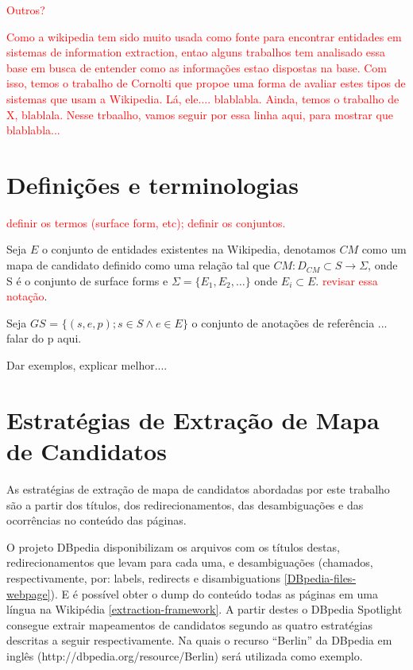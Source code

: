 \documentclass[10pt,a4paper]{llncs}
\begin{document}
\textcolor{red}{Outros?}


\textcolor{red}{Como a wikipedia tem sido muito usada como fonte para encontrar entidades em sistemas de information extraction, entao alguns trabalhos tem analisado essa base em busca de entender como as informações estao dispostas na base. Com isso, temos o trabalho de Cornolti que propoe uma forma de avaliar estes tipos de sistemas que usam a Wikipedia. Lá, ele.... blablabla. Ainda, temos o trabalho de X, blablala. Nesse trbaalho, vamos seguir por essa linha aqui, para mostrar que blablabla...}

\section{Definições e terminologias}
\textcolor{red}{definir os termos (surface form, etc); definir os conjuntos.}

Seja $E$ o conjunto de entidades existentes na Wikipedia, denotamos $CM$ como um mapa de candidato definido como uma relação tal que $CM : D_{CM} \subset S \rightarrow \Sigma $, onde S é o conjunto de surface forms e $ \Sigma = \{ E_1, E_2, \ldots \}$ onde $E_i \subset E$. \textcolor{red}{revisar essa notação}.

Seja $GS$ = $\{(s, e, p); s \in S \wedge e \in E\}$ o conjunto de anotações de referência ... falar do p aqui.

Dar exemplos, explicar melhor....



\section{Estratégias de Extração de Mapa de Candidatos} \label{extracao-mapa-candidatos}
\indent\indent As estratégias de extração de mapa de candidatos abordadas por este trabalho são a partir dos títulos, dos redirecionamentos, das desambiguações e das ocorrências no conteúdo das páginas.

O projeto DBpedia disponibilizam os arquivos com os títulos destas, redirecionamentos que levam para cada uma, e desambiguações (chamados, respectivamente, por: labels, redirects e disambiguations \ref{DBpedia-files-webpage}). E é possível obter o dump do conteúdo todas as páginas em uma língua na Wikipédia \ref{extraction-framework}. A partir destes o DBpedia Spotlight consegue extrair mapeamentos de candidatos segundo as quatro estratégias descritas a seguir respectivamente. %
Na quais o recurso ``Berlin'' da DBpedia em inglês (http://dbpedia.org/resource/Berlin) será utilizada como exemplo.
\end{document}
